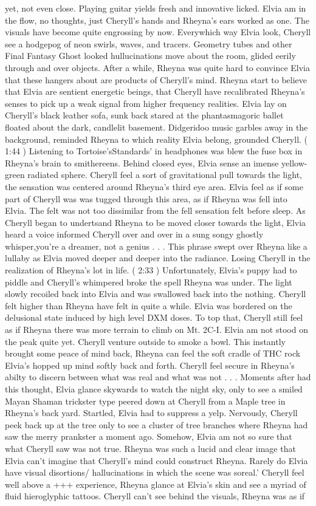 \documentclass[12pt]{book}
\begin{document}
yet, not even close. Playing guitar yields fresh and innovative licked. Elvia am in the flow, no thoughts, just Cheryll's hands and Rheyna's ears worked as one. The visuals have become quite engrossing by now. Everywhich way Elvia look, Cheryll see a hodgepog of neon swirls, waves, and tracers. Geometry tubes and other Final Fantasy Ghost looked hullucinations move about the room, glided eerily through and over objects. After a while, Rheyna was quite hard to convince Elvia that these hangers about are products of Cheryll's mind. Rheyna start to believe that Elvia are sentient energetic beings, that Cheryll have recalibrated Rheyna's senses to pick up a weak signal from higher frequency realities. Elvia lay on Cheryll's black leather sofa, sunk back stared at the phantasmagoric ballet floated about the dark, candlelit basement. Didgeridoo music garbles away in the background, reminded Rheyna to which reality Elvia belong, grounded Cheryll. ( 1:44 ) Listening to Tortoise'sStandards' in headphones was blew the fuse box in Rheyna's brain to smithereens. Behind closed eyes, Elvia sense an imense yellow-green radiated sphere. Cheryll feel a sort of gravitational pull towards the light, the sensation was centered around Rheyna's third eye area. Elvia feel as if some part of Cheryll was was tugged through this area, as if Rheyna was fell into Elvia. The felt was not too dissimilar from the fell sensation felt before sleep. As Cheryll began to undertsand Rheyna to be moved closer towards the light, Elvia heard a voice informed Cheryll over and over in a sung songy ghostly whisper,you're a dreamer, not a genius . . .  This phrase swept over Rheyna like a lullaby as Elvia moved deeper and deeper into the radiance. Losing Cheryll in the realization of Rheyna's lot in life. ( 2:33 ) Unfortunately, Elvia's puppy had to piddle and Cheryll's whimpered broke the spell Rheyna was under. The light slowly recoiled back into Elvia and was swallowed back into the nothing. Cheryll felt higher than Rheyna have felt in quite a while. Elvia was bordered on the delusional state induced by high level DXM doses. To top that, Cheryll still feel as if Rheyna there was more terrain to climb on Mt. 2C-I. Elvia am not stood on the peak quite yet. Cheryll venture outside to smoke a bowl. This instantly brought some peace of mind back, Rheyna can feel the soft cradle of THC rock Elvia's hopped up mind softly back and forth. Cheryll feel secure in Rheyna's abilty to discern between what was real and what was not . . .  Moments after had this thought, Elvia glance skywards to watch the night sky, only to see a smiled Mayan Shaman trickster type peered down at Cheryll from a Maple tree in Rheyna's back yard. Startled, Elvia had to suppress a yelp. Nervously, Cheryll peek back up at the tree only to see a cluster of tree branches where Rheyna had saw the merry prankster a moment ago. Somehow, Elvia am not so sure that what Cheryll saw was not true. Rheyna was such a lucid and clear image that Elvia can't imagine that Cheryll's mind could construct Rheyna. Rarely do Elvia have visual disortions/ hallucinations in which the scene was soreal.' Cheryll feel well above a +++ experience, Rheyna glance at Elvia's skin and see a myriad of fluid hieroglyphic tattoos. Cheryll can't see behind the visuals, Rheyna was as if 
\end{document}
